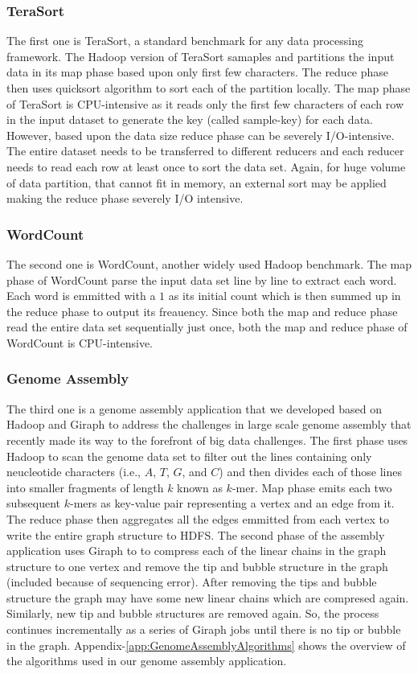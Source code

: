 \documentclass[journal]{IEEEtran}
\begin{document}
\subsubsection{TeraSort}
The first one is TeraSort, a standard benchmark for any data processing framework. The Hadoop version of TeraSort samaples and partitions the input data in its map phase based upon only first few characters. The reduce phase then uses quicksort algorithm to sort each of the partition locally. 
The map phase of TeraSort is CPU-intensive as it reads only the first few characters of each row in the input dataset to generate the key (called sample-key) for each data. However, based upon the data size reduce phase can be severely I/O-intensive. The entire dataset needs to be transferred to different reducers and each reducer needs to read each row at least once to sort the data set. Again, for huge volume of data partition, that cannot fit in memory, an external sort may be applied making the reduce phase severely I/O intensive.  

\subsubsection{WordCount}
The second one is WordCount, another widely used Hadoop benchmark. The map phase of WordCount parse the input data set line by line to extract each word. Each word is emmitted with a $1$ as its initial count which is then summed up in the reduce phase to output its  freauency. 
Since both the map and reduce phase read the entire data set sequentially just once, both the map and reduce phase of WordCount is CPU-intensive. 

\subsubsection{Genome Assembly}
The third one is a genome assembly application that we developed based on Hadoop and Giraph to address the challenges in large scale genome assembly that recently made its way to the forefront of big data challenges. The first phase uses Hadoop to scan the genome data set to filter out the lines containing only neucleotide characters (i.e., $A$, $T$, $G$, and $C$) and then divides each of those lines into smaller fragments of length $k$ known as $k$-mer. Map phase emits each two subsequent $k$-mers as key-value pair representing a vertex and an edge from it. The reduce phase then aggregates all the edges emmitted from each vertex to write the entire graph structure to HDFS. The second phase of the assembly application uses Giraph to to compress each of the linear chains in the graph structure to one vertex and remove the tip and bubble structure in the graph (included because of sequencing error). After removing the tips and bubble structure the graph may have some new linear chains which are compresed again. Similarly, new tip and bubble structures are removed again. So, the process continues incrementally as a series of Giraph jobs until there is no tip or bubble in the graph. Appendix-\ref{app:GenomeAssemblyAlgorithms} shows the overview of the algorithms used in our genome assembly application.
\end{document}
